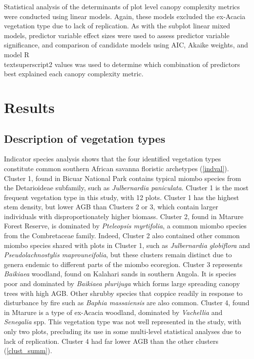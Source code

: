 \documentclass[11pt,a4paper]{article}
\begin{document}
Statistical analysis of the determinants of plot level canopy complexity metrics were conducted using linear models. Again, these models excluded the ex-Acacia vegetation type due to lack of replication. As with the subplot linear mixed models, predictor variable effect sizes were used to assess predictor variable significance, and comparison of candidate models using AIC, Akaike weights, and model R\\textsuperscript{2} values was used to determine which combination of predictors best explained each canopy complexity metric.





\section{Results}

\subsection{Description of vegetation types}

Indicator species analysis shows that the four identified vegetation types constitute common southern African savanna floristic archetypes (\autoref{indval}). Cluster 1, found in Bicuar National Park contains typical miombo species from the Detarioideae subfamily, such as \textit{Julbernardia paniculata}. Cluster 1 is the most frequent vegetation type in this study, with 12 plots. Cluster 1 has the highest stem density, but lower AGB than Clusters 2 or 3, which contain larger individuals with disproportionately higher biomass. Cluster 2, found in Mtarure Forest Reserve, is dominated by \textit{Pteleopsis myrtifolia}, a common miombo species from the Combretaceae family. Indeed, Cluster 2 also contained other common miombo species shared with plots in Cluster 1, such as \textit{Julbernardia globiflora} and \textit{Pseudolachnostylis maprouneifolia}, but these clusters remain distinct due to genera endemic to different parts of the miombo ecoregion. Cluster 3 represents \textit{Baikiaea} woodland, found on Kalahari sands in southern Angola. It is species poor and dominated by \textit{Baikiaea plurijuga} which forms large spreading canopy trees with high AGB. Other shrubby species that coppice readily in response to disturbance by fire such as \textit{Baphia massaiensis} are also common. Cluster 4, found in Mtarure is a type of ex-Acacia woodland, dominated by \textit{Vachellia} and \textit{Senegalia} spp. This vegetation type was not well represented in the study, with only two plots, precluding its use in some multi-level statistical analyses due to lack of replication. Cluster 4 had far lower AGB than the other clusters (\autoref{clust_summ}). 
\end{document}
